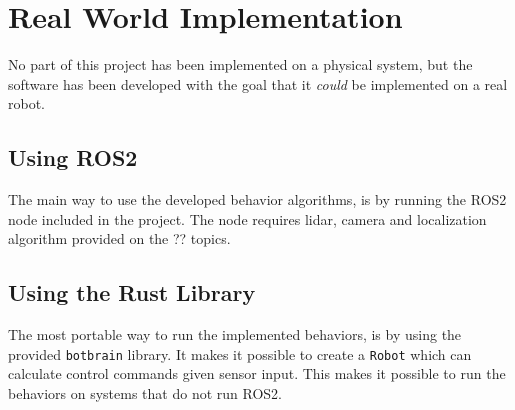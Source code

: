 \section{Real World Implementation}
No part of this project has been implemented on a physical system, but the software has been developed with the goal that it \emph{could} be implemented on a real robot.

\subsection{Using ROS2}
The main way to use the developed behavior algorithms, is by running the ROS2 node included in the project. The node requires {\color{red} lidar, camera and localization algorithm provided on the ?? topics}.

\subsection{Using the Rust Library}
The most portable way to run the implemented behaviors, is by using the {\color{red} provided} \texttt{botbrain} library. It makes it possible to create a \texttt{Robot} which can calculate control commands given sensor input. This makes it possible to run the behaviors on systems that do not run ROS2.

